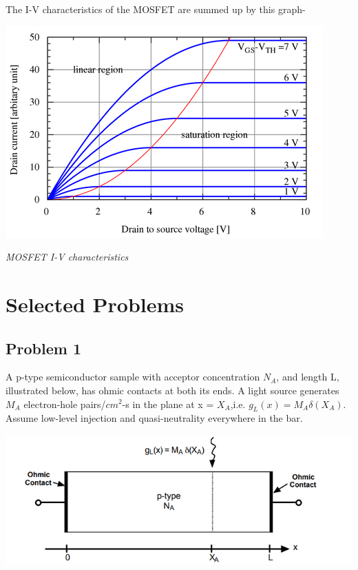 \documentclass[12 pt]{article}
\begin{document}
The I-V characteristics of the MOSFET are summed up by this graph- \newline

\par
\begin{center}
    \includegraphics{MOSFET_I-V (2).png}
\end{center}
\begin{center}
    \emph{\hspace{2.5 cm}MOSFET I-V characteristics\newline}
\end{center}
\par

\section{Selected Problems}

\subsection{Problem 1}
A p-type semiconductor sample with acceptor concentration $N_{A}$, and length L, illustrated below, has ohmic contacts at both its ends. A light source generates $M_{A}$ electron-hole pairs/$cm^{2}$-s in the plane at x = $X_{A}$,i.e. $g_{L}(x) = M_{A}\delta (X_{A})$. Assume low-level injection and quasi-neutrality everywhere in the bar. 

\par
\begin{center}
    \includegraphics{problem_1_1.png}
\end{center}
\par
\end{document}
